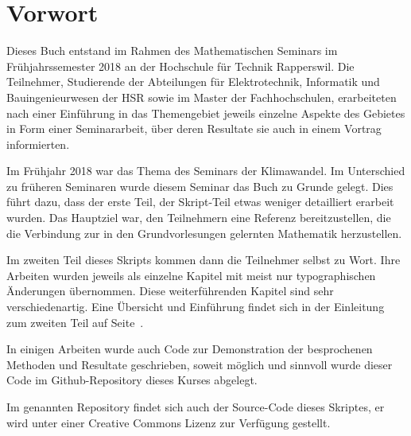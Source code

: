 %
%
%
\chapter*{Vorwort}
\rhead{}
Dieses Buch entstand im Rahmen des Mathematischen Seminars
im Frühjahrssemester 2018 an der Hochschule für Technik Rapperswil.
Die Teilnehmer, Studierende der Abteilungen für Elektrotechnik,
Informatik und Bauingenieurwesen der HSR sowie im Master der Fachhochschulen,
erarbeiteten nach einer Einführung in das Themengebiet jeweils
einzelne Aspekte des Gebietes in Form einer Seminararbeit, über
deren Resultate sie auch in einem Vortrag informierten. 

Im Frühjahr 2018 war das Thema des Seminars der Klimawandel.
Im Unterschied zu früheren Seminaren wurde diesem Seminar das Buch
\cite{skript:kaperengler}
zu Grunde gelegt.
Dies führt dazu, dass der erste Teil, der Skript-Teil etwas weniger
detailliert erarbeit wurden.
Das Hauptziel war, den Teilnehmern eine Referenz bereitzustellen,
die die Verbindung zur in den Grundvorlesungen gelernten
Mathematik herzustellen.

Im zweiten Teil dieses Skripts kommen dann die Teilnehmer selbst zu Wort.
Ihre Arbeiten wurden jeweils als einzelne
Kapitel mit meist nur typographischen Änderungen übernommen.
Diese weiterführenden Kapitel sind sehr verschiedenartig.
Eine Übersicht und Einführung findet sich in der Einleitung
zum zweiten Teil auf Seite~\pageref{skript:uebersicht}.

In einigen Arbeiten wurde auch Code zur Demonstration der 
besprochenen Methoden und Resultate geschrieben, soweit
möglich und sinnvoll wurde dieser Code im Github-Repository
dieses Kurses
\cite{skript:repo}
abgelegt.

Im genannten Repository findet sich auch der Source-Code dieses
Skriptes, er wird unter einer Creative Commons Lizenz
zur Verfügung gestellt.




